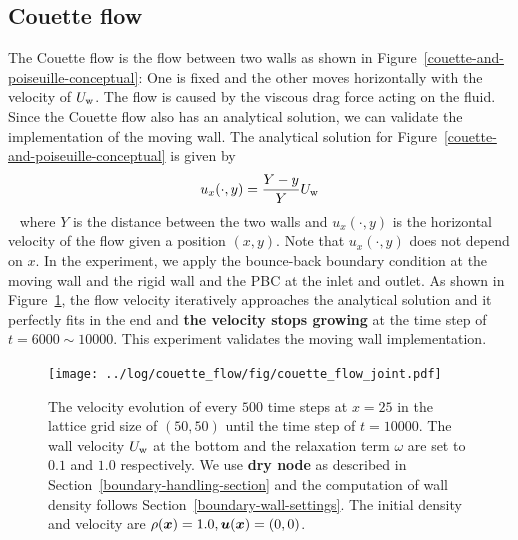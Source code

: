 \subsection{Couette flow}
The Couette flow is the flow between two walls as shown in
Figure~\ref{couette-and-poiseuille-conceptual}:
One is fixed and the other moves horizontally with the velocity of $U_{\rm w}$.
The flow is caused by the viscous drag force acting on the fluid.
Since the Couette flow also has an analytical solution,
we can validate the implementation of the moving wall.
The analytical solution for Figure~\ref{couette-and-poiseuille-conceptual} is given by
\begin{equation*}
\begin{aligned}
  u_x(\cdot, y) =\frac{Y - y}{Y}U_{\rm w}
\end{aligned}
\end{equation*}
~\cite{nagy2019graphical} where $Y$ is the distance between the two walls
and $u_x(\cdot, y)$ is the horizontal velocity of the flow
given a position $(x, y)$.
Note that $u_x(\cdot, y)$ does not depend on $x$.
In the experiment, we apply the bounce-back boundary condition
at the moving wall and the rigid wall
and the PBC at the inlet and outlet.
As shown in Figure~\ref{fig:couette-velocity-evolution},
the flow velocity iteratively approaches
the analytical solution and it perfectly fits in the end
and {\bf the velocity stops growing} at the time step of $t = 6000 \sim 10000$.
This experiment validates the moving wall implementation.

\begin{figure}[H]
  \vspace{-1mm}
  \centering
  \texttt{[image: ../log/couette\_flow/fig/couette\_flow\_joint.pdf]}
  \vspace{-5mm}
  \caption{The velocity evolution of every $500$ time steps at
  $x = 25$ in the lattice grid size of $(50, 50)$ until the time step of $t = 10000$.
  The wall velocity $U_{\rm w}$ at the bottom and the relaxation term $\omega$ are set
  to $0.1$ and $1.0$ respectively.
  We use {\bf dry node} as described in Section~\ref{boundary-handling-section}
  and the computation of wall density follows Section~\ref{boundary-wall-settings}.
  The initial density and velocity are $\rho(\boldsymbol{x}) = 1.0, \boldsymbol{u}(\boldsymbol{x}) = (0, 0)$.
  \label{fig:couette-velocity-evolution}}
\end{figure}

